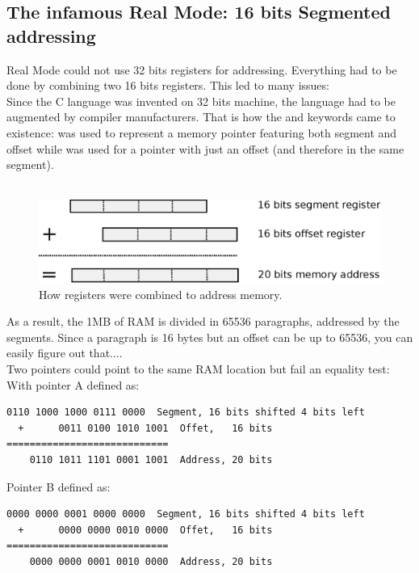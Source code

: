 \documentclass[book.tex]{subfiles}
\begin{document}
\subsection{The infamous Real Mode: 16 bits Segmented addressing}
Real Mode could not use 32 bits registers for addressing. Everything had to be done by combining two 16 bits registers. This led to many issues:\\
\bigskip
Since the C language was invented on 32 bits machine, the language had to be augmented by compiler manufacturers. That is how the  and  keywords came to existence:  was used to represent a memory pointer featuring both segment and offset while  was used for a pointer with just an offset (and therefore in the same segment).\\
\\
\begin{figure}[H]
\centering
\includegraphics[scale=0.8]{imgs/register_combination_20_bits_address.eps}
\caption{How registers were combined to address memory.}
\label{fig:register_comb_to_20_bits}
\end{figure}
  
\bigskip
  
As a result, the 1MB of RAM is divided in 65536 paragraphs, addressed by the segments. Since a paragraph is 16 bytes but an offset can be up to 65536, you can easily figure out that....\\
  
Two pointers could point to the same RAM location but fail an equality test:\\
\bigskip
With pointer A defined as:
\begin{Verbatim}[fontsize=\relsize{-1}]
    0110 1000 1000 0111 0000  Segment, 16 bits shifted 4 bits left  
  +      0011 0100 1010 1001  Offet,   16 bits
============================
    0110 1011 1101 0001 1001  Address, 20 bits
\end{Verbatim}

\bigskip

Pointer B defined as:
\begin{Verbatim}[fontsize=\relsize{-1}]
    0000 0000 0001 0000 0000  Segment, 16 bits shifted 4 bits left  
  +      0000 0000 0010 0000  Offet,   16 bits
============================
    0000 0000 0001 0010 0000  Address, 20 bits
\end{Verbatim}
\end{document}
